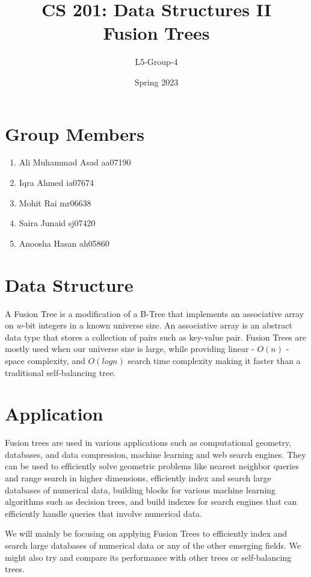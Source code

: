 \documentclass{article}
\title {CS 201: Data Structures II \\ Fusion Trees} %
\author{L5-Group-4} %
\date{Spring 2023}
\begin{document}
\maketitle
\section{Group Members}
\begin{enumerate}
  \item Ali Muhammad Asad aa07190
  \item Iqra Ahmed ia07674
  \item Mohit Rai mr06638
  \item Saira Junaid sj07420
  \item Anoosha Hasan ah05860
\end{enumerate}

\section{Data Structure}
A Fusion Tree is a modification of a B-Tree that implements an associative array on $w$-bit integers in a known universe size. An associative array is an abstract data type that stores a collection of pairs such as key-value pair. Fusion Trees are mostly used when our universe size is large, while providing linear - $ O(n) $ - space complexity, and $ O(logn) $ search time complexity making it faster than a traditional self-balancing tree. 

\section{Application}
Fusion trees are used in various applications such as computational geometry, databases, and data compression, machine learning and web search engines. They can be used to efficiently solve geometric problems like nearest neighbor queries and range search in higher dimensions, efficiently index and search large databases of numerical data, building blocks for various machine learning algorithms such as decision trees, and build indexes for search engines that can efficiently handle queries that involve numerical data.

\noindent We will mainly be focusing on applying Fusion Trees to efficiently index and search large databases of numerical data or any of the other emerging fields. We might also try and compare its performance with other trees or self-balancing trees.  
\end{document}
